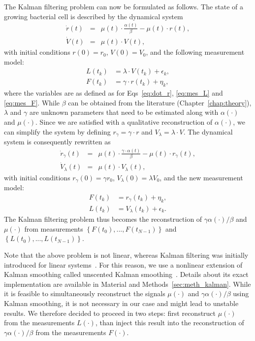 The Kalman filtering problem can now be formulated as follows.
The state of a growing bacterial cell is described by the dynamical system
\begin{eqnarray}
\dot{r}(t) &=& \mu (t) \cdot \frac{\alpha(t)}{\beta} - \mu (t) \cdot r(t),\\
\dot{V}(t) &=& \mu (t) \cdot V(t),
\end{eqnarray}
with initial conditions $r(0) = r_0$, $V(0) = V_0$, and the following measurement model:
\begin{eqnarray}
L(t_k) &= \lambda \cdot V(t_k) + \epsilon_k,\\
F(t_k) &= \gamma \cdot r(t_k) + \eta_k,
\end{eqnarray}
where the variables are as defined as for Eqs~\ref{eq:dot_r}, \ref{eq:mes_L} and \ref{eq:mes_F}.
While $\beta$ can be obtained from the literature (Chapter~\ref{chap:theory}), $\lambda$ and $\gamma$ are unknown parameters that need to be estimated along with $\alpha (\cdot)$ and $\mu (\cdot)$.
Since we are satisfied with a qualitative reconstruction of $\alpha (\cdot)$, we can simplify the system by defining $r_\gamma = \gamma \cdot r$ and $V_\lambda = \lambda \cdot V$.
The dynamical system is consequently rewritten as
\begin{eqnarray}
\dot{r}_\gamma(t) &=& \mu (t) \cdot\frac{\gamma \cdot \alpha(t)}{\beta} - \mu (t) \cdot r_\gamma (t),\label{eq:r_prob}\\
\dot{V}_\lambda (t) &=& \mu (t) \cdot V_\lambda (t),\label{eq:V_prob}
\end{eqnarray}
with initial conditions $r_\gamma (0) = \gamma r_0$, $V_\lambda (0) = \lambda V_0$, and the new measurement model:
\begin{eqnarray}
F(t_k) &= r_\gamma (t_k) + \eta_k,\label{eq:F_prob}\\
L(t_k) &= V_\lambda(t_k) + \epsilon_k.\label{eq:L_prob}
\end{eqnarray}
The Kalman filtering problem thus becomes the reconstruction of $\gamma \alpha (\cdot) / \beta$ and $\mu (\cdot)$ from measurements $\left\{ F(t_0), ..., F(t_{N-1}) \right\}$ and $\left\{L(t_0), ..., L(t_{N-1}) \right\}$.

Note that the above problem is not linear, whereas Kalman filtering was initially introduced for linear systems~\cite{kalman_new_1960,kailath_linear_2000}.
For this reason, we use a nonlinear extension of Kalman smoothing called unscented Kalman smoothing~\cite{julier_new_1997,jazwinski_stochastic_2007}.
Details about its exact implementation are available in Material and Methods~\ref{sec:meth_kalman}.
While it is feasible to simultaneously reconstruct the signals $\mu (\cdot)$ and $\gamma \alpha (\cdot) / \beta$ using Kalman smoothing, it is not necessary in our case and might lead to unstable results.
We therefore decided to proceed in two steps: first reconstruct $\mu(\cdot)$ from the measurements $L(\cdot)$, than inject this result into the reconstruction of $\gamma \alpha(\cdot) / \beta$ from the measurements $F(\cdot)$.

